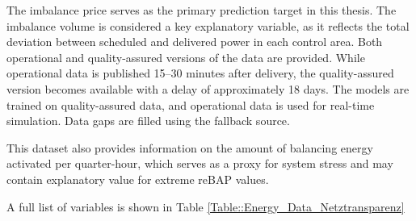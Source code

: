 \documentclass[class=scrbook, crop=false]{standalone}
\begin{document}
The imbalance price serves as the primary prediction target in this thesis. The imbalance volume is considered a key explanatory variable, as it reflects the total deviation between scheduled and delivered power in each control area.
Both operational and quality-assured versions of the data are provided. While operational data is published 15–30 minutes after delivery, the quality-assured version becomes available with a delay of approximately 18 days. The models are trained on quality-assured data, and operational data is used for real-time simulation. Data gaps are filled using the fallback source.

 This dataset also provides information on the amount of balancing energy activated per quarter-hour, which serves as a proxy for system stress and may contain explanatory value for extreme reBAP values.
 
A full list of variables is shown in Table \ref{Table::Energy_Data_Netztransparenz}




\end{document}
